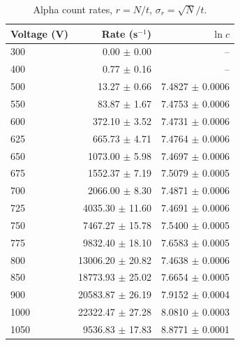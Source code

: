 \begin{table}[htbp]
\centering
\caption{Alpha count rates, $r=N/t$, $\sigma_r=\sqrt{N}/t$.}
\label{tab:alpha-rates}
\begin{tabular}{lrr}
\toprule
Voltage (V) & Rate (s$^{-1}$) & $\ln c$ \\
\midrule
300 & 0.00 $\pm$ 0.00 & -- \\
400 & 0.77 $\pm$ 0.16 & -- \\
500 & 13.27 $\pm$ 0.66 & 7.4827 $\pm$ 0.0006 \\
550 & 83.87 $\pm$ 1.67 & 7.4753 $\pm$ 0.0006 \\
600 & 372.10 $\pm$ 3.52 & 7.4731 $\pm$ 0.0006 \\
625 & 665.73 $\pm$ 4.71 & 7.4764 $\pm$ 0.0006 \\
650 & 1073.00 $\pm$ 5.98 & 7.4697 $\pm$ 0.0006 \\
675 & 1552.37 $\pm$ 7.19 & 7.5079 $\pm$ 0.0005 \\
700 & 2066.00 $\pm$ 8.30 & 7.4871 $\pm$ 0.0006 \\
725 & 4035.30 $\pm$ 11.60 & 7.4691 $\pm$ 0.0006 \\
750 & 7467.27 $\pm$ 15.78 & 7.5400 $\pm$ 0.0005 \\
775 & 9832.40 $\pm$ 18.10 & 7.6583 $\pm$ 0.0005 \\
800 & 13006.20 $\pm$ 20.82 & 7.4638 $\pm$ 0.0006 \\
850 & 18773.93 $\pm$ 25.02 & 7.6654 $\pm$ 0.0005 \\
900 & 20583.87 $\pm$ 26.19 & 7.9152 $\pm$ 0.0004 \\
1000 & 22322.47 $\pm$ 27.28 & 8.0810 $\pm$ 0.0003 \\
1050 & 9536.83 $\pm$ 17.83 & 8.8771 $\pm$ 0.0001 \\
\bottomrule
\end{tabular}
\end{table}
